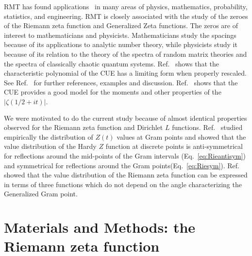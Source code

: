 \documentclass[twoside]{article}
\begin{document}
RMT has found applications~\cite{KeatingSnaith 2000,Odlyzko 1992} 
in many areas of physics, mathematics,  probability, statistics, and engineering. 
 RMT is closely associated with the study of the zeroes of the Riemann zeta function 
 and Generalized Zeta functions. The zeros are of interest to mathematicians and physicists. 
Mathematicians 
study the spacings because of its applications to analytic number theory, 
while physicists study it because of its  relation 
to the theory of the spectra of random matrix theories 
and the spectra of classically chaotic quantum systems.
Ref.~\cite{Chhaibi 2014} shows that the characteristic polynomial 
of the CUE has a limiting form when properly rescaled. 
See Ref.~\cite{Francesco 2007,os6, Hanga 2020} for  further references,
examples and discussion. 
 Ref.~\cite{KeatingSnaith 2000} shows that the CUE provides
a good model for the moments and other properties of the $|\zeta(1/2 + it)|$.

We were motivated to do the current study because of almost identical 
properties observed
for the Riemann zeta function and Dirichlet $L$ functions. 
Ref.~\cite{Shanker 2018a,Shanker 2018b} studied empirically 
the distribution of $Z(t)$ values 
at Gram points and showed  that  the  value
distribution of the Hardy $Z$ function at discrete points is anti-symmetrical for 
reflections around the mid-points of the Gram intervals (Eq.~\ref{eq:Rieantisym}) 
and symmetrical for reflections around the Gram points(Eq.~\ref{eq:Riesym}). 
Ref.~\cite{Shanker 2020} showed that the value distribution of the Riemann zeta function 
can be expressed in terms of three  functions 
 which do not depend on the angle characterizing the Generalized Gram point. 

\section{\label{sec2}Materials and Methods: the Riemann zeta function}
\end{document}
